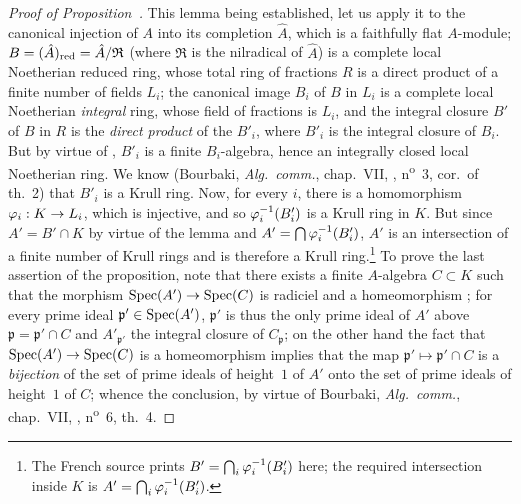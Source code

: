 \begin{proof}[Proof of Proposition~{\rm{}}]
This lemma being established, let us apply it to the canonical injection of $A$ into its completion $\hat{A}$, which is a faithfully flat $A$-module; $B=(\hat{A})_{\mathrm{red}}=\hat{A}/\mathfrak{R}$ (where $\mathfrak{R}$ is the nilradical of $\hat{A}$) is a complete local Noetherian reduced ring, whose total ring of
fractions $R$ is a direct product of a finite number of fields $L_i$; the canonical image $B_i$ of $B$ in $L_i$ is a complete local Noetherian \emph{integral} ring, whose field of fractions is $L_i$, and the integral closure $B'$ of $B$ in $R$ is the \emph{direct product} of the $B'_i$, where $B'_i$ is the integral closure of $B_i$.
But by virtue of , $B'_i$ is a finite $B_i$-algebra, hence an integrally closed local Noetherian ring.
We know (Bourbaki, \emph{Alg.~comm.}, chap.~VII, , n\textsuperscript{o}~3, cor.~of th.~2) that $B'_i$ is a Krull ring.
Now, for every $i$, there is a homomorphism $\varphi_i:K\to L_i$, which is injective, and so $\varphi_i^{-1}(B'_i)$ is a Krull ring in $K$.
But since $A'=B'\cap K$ by virtue of the lemma and $A'=\bigcap\varphi_i^{-1}(B'_i)$, $A'$ is an intersection of a finite number of Krull rings and is therefore a Krull ring.\footnote{The French source prints $B'=\bigcap_i\varphi_i^{-1}(B'_i)$ here; the required intersection inside $K$ is $A'=\bigcap_i\varphi_i^{-1}(B'_i)$.}
To prove the last assertion of the proposition, note that there exists a finite $A$-algebra $C\subset K$ such that the morphism $\operatorname{Spec}(A')\to\operatorname{Spec}(C)$ is radiciel and a homeomorphism ; for every prime ideal $\mathfrak{p}'\in\operatorname{Spec}(A')$, $\mathfrak{p}'$ is thus the only prime ideal of $A'$ above $\mathfrak{p}=\mathfrak{p}'\cap C$ and $A'_{\mathfrak{p}'}$ the integral closure of $C_\mathfrak{p}$; on the other hand the fact that $\operatorname{Spec}(A')\to\operatorname{Spec}(C)$ is a homeomorphism implies that the map $\mathfrak{p}'\mapsto\mathfrak{p}'\cap C$ is a \emph{bijection} of the set of prime ideals of height~$1$ of $A'$ onto the set of prime ideals of height~$1$ of $C$; whence the conclusion, by virtue of Bourbaki, \emph{Alg.~comm.}, chap.~VII, , n\textsuperscript{o}~6, th.~4.
\end{proof}

